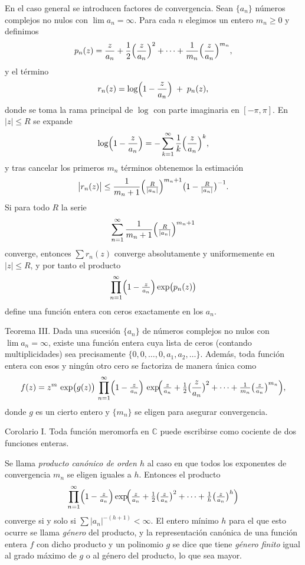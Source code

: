\documentclass{article}
\theoremstyle{nonumberplain}
\begin{document}
En el caso general se introducen factores de convergencia. Sean \(\{a_{n}\}\) números complejos no nulos con \(\lim a_{n}=\infty\). Para cada \(n\) elegimos un entero \(m_{n}\ge0\) y definimos
\[
p_{n}(z)
=\frac{z}{a_{n}}
+\frac{1}{2}\Bigl(\frac{z}{a_{n}}\Bigr)^{2}
+\cdots
+\frac{1}{m_{n}}\Bigl(\frac{z}{a_{n}}\Bigr)^{m_{n}},
\]
y el término
\[
r_{n}(z)
=\log\Bigl(1-\frac{z}{a_{n}}\Bigr)\;+\;p_{n}(z),
\]
donde se toma la rama principal de \(\log\) con parte imaginaria en \([-\pi,\pi]\). En \(|z|\le R\) se expande
\[
\log\Bigl(1-\frac{z}{a_{n}}\Bigr)
=-\sum_{k=1}^\infty\frac{1}{k}\Bigl(\frac{z}{a_{n}}\Bigr)^{k},
\]
y tras cancelar los primeros \(m_{n}\) términos obtenemos la estimación
\[
\bigl|r_{n}(z)\bigr|
\le
\frac{1}{m_{n}+1}\Bigl(\tfrac{R}{|a_{n}|}\Bigr)^{m_{n}+1}
\bigl(1-\tfrac{R}{|a_{n}|}\bigr)^{-1}.
\]
Si para todo \(R\) la serie
\[
\sum_{n=1}^\infty
\frac{1}{m_{n}+1}\Bigl(\tfrac{R}{|a_{n}|}\Bigr)^{m_{n}+1}
\]
converge, entonces \(\sum r_{n}(z)\) converge absolutamente y uniformemente en \(|z|\le R\), y por tanto el producto
\[
\prod_{n=1}^\infty
\Bigl(1-\tfrac{z}{a_{n}}\Bigr)
\exp\bigl(p_{n}(z)\bigr)
\]
define una función entera con ceros exactamente en los \(a_{n}\).

Teorema III. Dada una sucesión \(\{a_{n}\}\) de números complejos no nulos con \(\lim a_{n}=\infty\), existe una función entera cuya lista de ceros (contando multiplicidades) sea precisamente \(\{0,0,\dots,0,a_{1},a_{2},\dots\}\). Además, toda función entera con esos y ningún otro cero se factoriza de manera única como
\[
f(z)
= z^{m}\,\exp\bigl(g(z)\bigr)\,
\prod_{n=1}^{\infty}
\Bigl(1-\tfrac{z}{a_{n}}\Bigr)\,
\exp\!\Bigl(\tfrac{z}{a_{n}}
+\tfrac12\bigl(\frac{z}{a_{n}}\bigr)^{2}
+\cdots
+\tfrac{1}{m_{n}}\bigl(\tfrac{z}{a_{n}}\bigr)^{m_{n}}\Bigr),
\]
donde \(g\) es un cierto entero y \(\{m_{n}\}\) se eligen para asegurar convergencia.

Corolario I. Toda función meromorfa en \(\mathbb{C}\) puede escribirse como cociente de dos funciones enteras.

\medskip
Se llama \emph{producto canónico de orden \(h\)} al caso en que todos los exponentes de convergencia \(m_{n}\) se eligen iguales a \(h\). Entonces el producto
\[
\prod_{n=1}^{\infty}
\Bigl(1-\tfrac{z}{a_{n}}\Bigr)
\exp\!\Bigl(\tfrac{z}{a_{n}}
+\tfrac12\bigl(\tfrac{z}{a_{n}}\bigr)^{2}
+\cdots
+\tfrac{1}{h}\bigl(\tfrac{z}{a_{n}}\bigr)^{h}\Bigr)
\]
converge si y solo si \(\sum|a_{n}|^{-(h+1)}<\infty\). El entero mínimo \(h\) para el que esto ocurre se llama \emph{género} del producto, y la representación canónica de una función entera \(f\) con dicho producto y un polinomio \(g\) se dice que tiene \emph{género finito} igual al grado máximo de \(g\) o al género del producto, lo que sea mayor.
\end{document}
